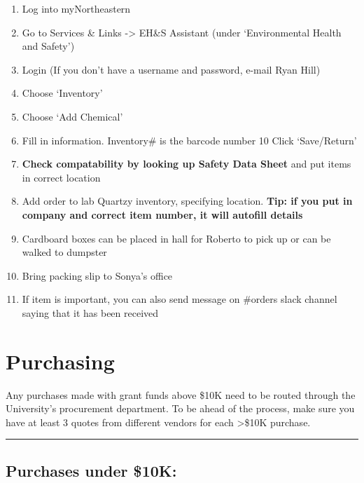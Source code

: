 \documentclass[
  letterpaper,
  DIV=11,
  numbers=noendperiod]{scrreprt}
\begin{document}
\begin{enumerate}
\def\labelenumi{\arabic{enumi}.}
\item
  Log into myNortheastern
\item
  Go to Services \& Links -\textgreater{} EH\&S Assistant (under
  `Environmental Health and Safety')
\item
  Login (If you don't have a username and password, e-mail Ryan Hill)
\item
  Choose `Inventory'
\item
  Choose `Add Chemical'
\item
  Fill in information. Inventory\# is the barcode number 10 Click
  `Save/Return'
\item
  \textbf{Check compatability by looking up Safety Data Sheet} and put
  items in correct location
\item
  Add order to lab Quartzy inventory, specifying location. \textbf{Tip:
  if you put in company and correct item number, it will autofill
  details}
\item
  Cardboard boxes can be placed in hall for Roberto to pick up or can be
  walked to dumpster
\item
  Bring packing slip to Sonya's office
\item
  If item is important, you can also send message on \#orders slack
  channel saying that it has been received
\end{enumerate}

\hypertarget{purchasing}{%
\chapter{Purchasing}\label{purchasing}}

Any purchases made with grant funds above \$10K need to be routed
through the University's procurement department. To be ahead of the
process, make sure you have at least 3 quotes from different vendors for
each \textgreater\$10K purchase.

\begin{center}\rule{0.5\linewidth}{0.5pt}\end{center}

\hypertarget{purchases-under-10k}{%
\section*{\texorpdfstring{\textbf{Purchases under
\$10K:}}{Purchases under \$10K:}}\label{purchases-under-10k}}
\end{document}
